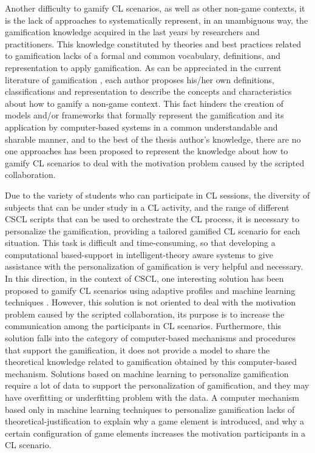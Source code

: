 Another difficulty to gamify CL scenarios, as well as other non-game contexts, it is the lack of approaches to systematically represent, in an unambiguous way, the gamification knowledge acquired in the last years by researchers and practitioners. This knowledge constituted by theories and best practices related to gamification lacks of a formal and common vocabulary, definitions, and representation to apply gamification. As can be appreciated in the current literature of gamification \cite{DichevaDichevAgreAngelova2015, HamariKoivistoSarsa2014, MoraRieraGonzalezArnedo-Moreno2015, SeabornFels2015}, each author proposes his/her own definitions, classifications and representation to describe the concepts and characteristics about how to gamify a non-game context. This fact hinders the creation of models and/or frameworks that formally represent the gamification and its application by computer-based systems in a common understandable and sharable manner, and to the best of the thesis author’s knowledge, there are no one approaches has been proposed to represent the knowledge about how to gamify CL scenarios to deal with the motivation problem caused by the scripted collaboration.

Due to the variety of students who can participate in CL sessions, the diversity of subjects that can be under study in a CL activity, and the range of different CSCL scripts that can be used to orchestrate the CL process, it is necessary to personalize the gamification, providing a tailored gamified CL scenario for each situation. This task is difficult and time-consuming, so that developing a computational based-support in intelligent-theory aware systems to give assistance with the personalization of gamification is very helpful and necessary. In this direction, in the context of CSCL, one interesting solution has been proposed to gamify CL scenarios using adaptive profiles and machine learning techniques \cite{KnutasIkonenMaggioriniRipamontiPorras2014,KnutasIkonenNikulaPorras2014}. However, this solution is not oriented to deal with the motivation problem caused by the scripted collaboration, its purpose is to increase the communication among the participants in CL scenarios. Furthermore, this solution falls into the category of computer-based mechanisms and procedures that support the gamification, it does not provide a model to share the theoretical knowledge related to gamification obtained by this computer-based mechanism. Solutions based on machine learning to personalize gamification require a lot of data to support the personalization of gamification, and they may have overfitting or underfitting problem with the data. A computer mechanism based only in machine learning techniques to personalize gamification lacks of theoretical-justification to explain why a game element is introduced, and why a certain configuration of game elements increases the motivation participants in a CL scenario.

